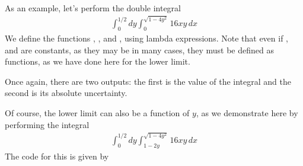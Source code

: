 \documentclass[letterpaper,10pt,english]{sphinxmanual}
\begin{document}
\sphinxAtStartPar
As an example, let’s perform the double integral
\begin{equation*}
\begin{split}\int_0^{1/2} dy \int_0^{\sqrt{1-4y^2}} 16xy\, dx\end{split}
\end{equation*}
\sphinxAtStartPar
We define the functions , , and , using lambda expressions.  Note that even if , and  are constants, as they may be in many cases, they must be defined as functions, as we have done here for the lower limit.

\begin{sphinxVerbatim}[commandchars=\\\{\},numbers=left,firstnumber=1,stepnumber=1]
      

     

     

    
 
\end{sphinxVerbatim}

\sphinxAtStartPar
Once again, there are two outputs: the first is the value of the integral and the second is its absolute uncertainty.

\sphinxAtStartPar
Of course, the lower limit can also be a function of \(y\), as we demonstrate here by performing the integral
\begin{equation*}
\begin{split}\int_0^{1/2} dy \int_{1-2y}^{\sqrt{1-4y^2}} 16xy\, dx\end{split}
\end{equation*}
\sphinxAtStartPar
The code for this is given by

\begin{sphinxVerbatim}[commandchars=\\\{\}]
     

    
 
\end{sphinxVerbatim}
\end{document}
